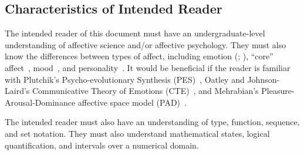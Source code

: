 \subsection{Characteristics of Intended Reader}\label{sec:doc_reader}
The intended reader of this document must have an undergraduate-level 
understanding of affective science and/or affective psychology. They must also  
know the differences between types of affect, including emotion 
(; 
), ``core'' 
affect~\citep[p.~170]{barrett2009affect}, mood~\citep{oxfordMood}, and
personality~\citep{oxfordPersonality}. It would be beneficial if the reader is 
familiar with Plutchik's Psycho-evolutionary Synthesis 
(PES)~\citep{robert1980emotion}, Oatley and Johnson-Laird's Communicative 
Theory of Emotions (CTE)~\citep{oatley1992best, oatley1987towards}, and 
Mehrabian's Pleasure-Arousal-Dominance affective space model 
(PAD)~\citep{mehrabian1980basic, mehrabian1996pleasure}.

The intended reader must also have an understanding of type, function, 
sequence, and set notation. They must also understand mathematical states, 
logical quantification, and intervals over a numerical domain.